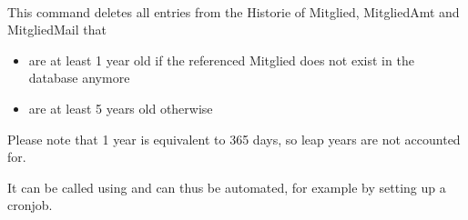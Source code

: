 \documentclass[letterpaper,10pt,english]{sphinxmanual}
\begin{document}
\begin{fulllineitems}
\label{\detokenize{masterCodeDoc:bin.management.commands.delete_old_historie.Command}}~

\begin{fulllineitems}
\label{\detokenize{masterCodeDoc:bin.management.commands.delete_old_historie.Command.handle}}
This command deletes all entries from the Historie of Mitglied, MitgliedAmt and MitgliedMail that
\begin{itemize}
\item {} 
are at least 1 year old if the referenced Mitglied does not exist in the database anymore

\item {} 
are at least 5 years old otherwise

\end{itemize}

Please note that 1 year is equivalent to 365 days, so leap years are not accounted for.

It can be called using  and can thus be automated, for example by setting up a cronjob.

\end{fulllineitems}


\begin{fulllineitems}
\label{\detokenize{masterCodeDoc:bin.management.commands.delete_old_historie.Command.help}}
\end{fulllineitems}


\end{fulllineitems}
\end{document}
